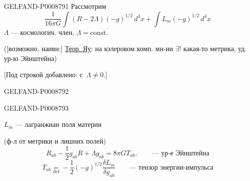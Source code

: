 \begin{GelfandAdjacentEvidence}{GELFAND-P000879}{1}
Рассмотрим
\begin{equation*}
\frac{1}{16\pi G}\int(R-2\Lambda)(-g)^{1/2}\,d^4x
+\int L_m(-g)^{1/2}\,d^4x
\tag{1}
\end{equation*}
$\Lambda$ --- космологич. член, $\Lambda=\mathrm{const}$.

([возможно, наивн:] \uline{Теор. Яу}: на кэлеровом комп. мн-ии $\exists!$ какая-то метрика, уд. ур-ю Эйнштейна)

[Под строкой добавлено: с $\,\Lambda\ne0$.]
\end{GelfandAdjacentEvidence}
\begin{GelfandAdjacentEvidence}{GELFAND-P000879}{2}


\end{GelfandAdjacentEvidence}
\begin{GelfandAdjacentEvidence}{GELFAND-P000879}{3}


$L_m$ --- лагранжиан поля материи

(ф-л от метрики и лишних полей)
\begin{equation*}
R_{ab}-\frac12 g_{ab}R+\Lambda g_{ab}=8\pi G T_{ab},
\qquad\text{--- ур-е Эйнштейна}
\tag{2}
\end{equation*}
\begin{equation*}
T_{ab}\underset{\mathrm{def}}{=}-\frac12(-g)^{1/2}
\frac{\delta L_m}{\delta g_{ab}}
\qquad\text{--- тензор энергии-импульса}
\tag{3}
\end{equation*}
\end{GelfandAdjacentEvidence}
